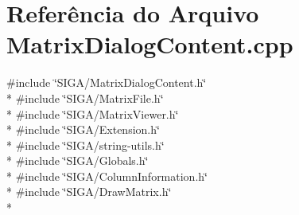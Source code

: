 \section{Referência do Arquivo Matrix\+Dialog\+Content.\+cpp}
\label{_matrix_dialog_content_8cpp}
{\ttfamily \#include \char`\"{}S\+I\+G\+A/\+Matrix\+Dialog\+Content.\+h\char`\"{}}\\*
{\ttfamily \#include \char`\"{}S\+I\+G\+A/\+Matrix\+File.\+h\char`\"{}}\\*
{\ttfamily \#include \char`\"{}S\+I\+G\+A/\+Matrix\+Viewer.\+h\char`\"{}}\\*
{\ttfamily \#include \char`\"{}S\+I\+G\+A/\+Extension.\+h\char`\"{}}\\*
{\ttfamily \#include \char`\"{}S\+I\+G\+A/string-\/utils.\+h\char`\"{}}\\*
{\ttfamily \#include \char`\"{}S\+I\+G\+A/\+Globals.\+h\char`\"{}}\\*
{\ttfamily \#include \char`\"{}S\+I\+G\+A/\+Column\+Information.\+h\char`\"{}}\\*
{\ttfamily \#include \char`\"{}S\+I\+G\+A/\+Draw\+Matrix.\+h\char`\"{}}\\*
